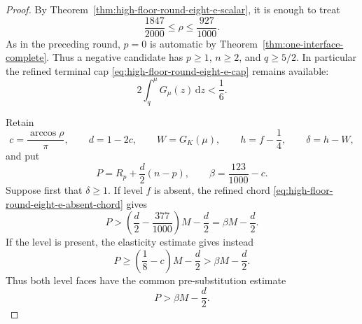 \documentclass[11pt]{article}
\theoremstyle{remark}
\newcommand{\dd}{\,\mathrm d}
\begin{document}
\begin{proof}
By Theorem~\ref{thm:high-floor-round-eight-e-scalar}, it is enough to
treat
\begin{equation}
 \frac{1847}{2000}\leq\rho\leq\frac{927}{1000}.
 \label{eq:high-floor-round-eight-f-band}
\end{equation}
As in the preceding round, $p=0$ is automatic by
Theorem~\ref{thm:one-interface-complete}.  Thus a negative candidate has
$p\geq1$, $n\geq2$, and $q\geq5/2$.  In particular the refined terminal
cap \eqref{eq:high-floor-round-eight-e-cap} remains available:
\begin{equation}
 \boxed{2\int_q^\mu G_\mu(z)\dd z<\frac16.}
 \label{eq:high-floor-round-eight-f-cap}
\end{equation}

Retain
\[
 c=\frac{\arccos\rho}{\pi},\qquad d=1-2c,\qquad
 W=G_K(\mu),\qquad h=f-\frac14,\qquad \delta=h-W,
\]
and put
\[
 P=R_p+\frac d2(n-p),\qquad
 \beta=\frac{123}{1000}-c.
\]
Suppose first that $\delta\geq1$.  If level $f$ is absent, the refined
chord \eqref{eq:high-floor-round-eight-e-absent-chord} gives
\[
 P>\left(\frac d2-\frac{377}{1000}\right)M-\frac d2
   =\beta M-\frac d2.
\]
If the level is present, the elasticity estimate gives instead
\[
 P\geq\left(\frac18-c\right)M-\frac d2
   >\beta M-\frac d2.
\]
Thus both level faces have the common pre-substitution estimate
\begin{equation}
 \boxed{P>\beta M-\frac d2.}
 \label{eq:high-floor-round-eight-f-common-prefix}
\end{equation}


\end{proof}
\end{document}
